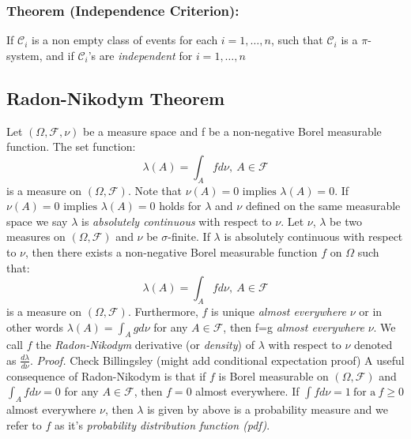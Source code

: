 \documentclass{article}
\begin{document}
\subsubsection{Theorem (Independence Criterion):}
If $\mathcal{C}_i$ is a non empty class of events for each $i=1,\ldots,n$, such that $\mathcal{C}_i$ is a $\pi$-system, and if $\mathcal{C}_i$'s are \emph{independent} for $i=1,\ldots,n$ 

\subsection{Radon-Nikodym Theorem}
Let $(\Omega,\mathcal{F},\nu)$ be a measure space and f be a non-negative Borel measurable function. The set function:
\[
\lambda(A)=\int_{A}fd\nu, \ A\in \mathcal{F}
\]
is a measure on $(\Omega,\mathcal{F})$. Note that $\nu(A)= 0 \text{ implies }\lambda(A)=0$. If $\nu(A)= 0 \text{ implies }\lambda(A)=0$ holds for $\lambda$ and $\nu$ defined on the same measurable space we say $\lambda$ is \emph{absolutely continuous} with respect to $\nu$. \newline \newline
Let $\nu$, $\lambda$ be two measures on  $(\Omega,\mathcal{F})$ and $\nu$ be $\sigma$-finite. If $\lambda$ is absolutely continuous with respect to $\nu$, then there exists a non-negative Borel measurable function $f$ on $\Omega$ such that:
\[
\lambda(A)=\int_{A}fd\nu, \ A\in \mathcal{F}
\]
is a measure on $(\Omega,\mathcal{F})$. Furthermore, $f$ is unique \emph{almost everywhere} $\nu$ or in other words $\lambda(A)=\int_{A}gd\nu$ for any $A\in \mathcal{F}$, then f=g \emph{almost everywhere} $\nu$. We call $f$ the \emph{Radon-Nikodym} derivative (or \emph{density}) of $\lambda$ with respect to $\nu$ denoted as $\frac{d\lambda}{d\nu}$. \newline \newline
\textit{Proof.}\newline \newline
Check Billingsley (might add conditional expectation proof)\newline \newline
A useful consequence of Radon-Nikodym is that if $f$ is Borel measurable on $(\Omega,\mathcal{F})$ and $\int_Afd\nu=0$ for any $A\in \mathcal{F}$, then $f=0$ almost everywhere. If $\int fd\nu=1 \ \text{for a} \ f \geq 0$ almost everywhere $\nu$, then $\lambda$ is given by above is a probability measure and we refer to $f$ as it's \emph{probability distribution function (pdf)}.\newline \newline
\end{document}
